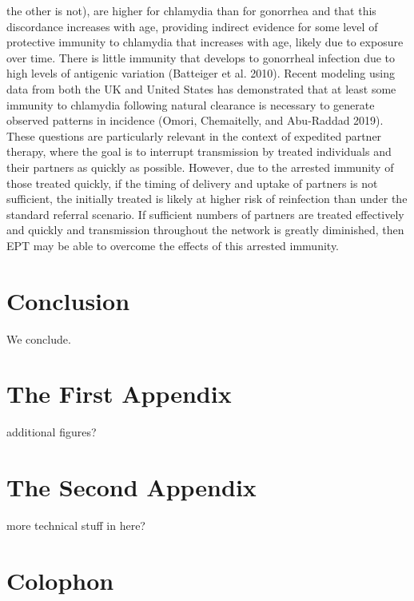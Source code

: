 \documentclass [11pt, proquest] {uwthesis}[2015/03/03]
\begin{document}
the other is not), are higher for chlamydia than for gonorrhea and that
this discordance increases with age, providing indirect evidence for
some level of protective immunity to chlamydia that increases with age,
likely due to exposure over time. There is little immunity that develops
to gonorrheal infection due to high levels of antigenic variation
(Batteiger et al. 2010). Recent modeling using data from both the UK and
United States has demonstrated that at least some immunity to chlamydia
following natural clearance is necessary to generate observed patterns
in incidence (Omori, Chemaitelly, and Abu-Raddad 2019). These questions
are particularly relevant in the context of expedited partner therapy,
where the goal is to interrupt transmission by treated individuals and
their partners as quickly as possible. However, due to the arrested
immunity of those treated quickly, if the timing of delivery and uptake
of partners is not sufficient, the initially treated is likely at higher
risk of reinfection than under the standard referral scenario. If
sufficient numbers of partners are treated effectively and quickly and
transmission throughout the network is greatly diminished, then EPT may
be able to overcome the effects of this arrested immunity.

\chapter*{Conclusion}\label{conclusion}

We conclude.

\appendix

\chapter{The First Appendix}\label{the-first-appendix}

additional figures?

\chapter{The Second Appendix}\label{the-second-appendix}

more technical stuff in here?

\chapter*{Colophon}\label{colophon}
\end{document}
